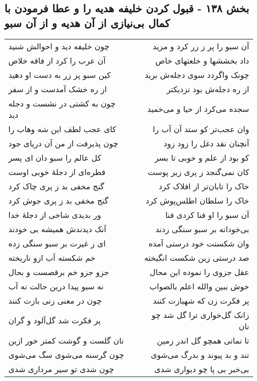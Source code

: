 \begin{center}
\section*{بخش ۱۳۸ - قبول کردن خلیفه هدیه را و عطا فرمودن با کمال بی‌نیازی از آن هدیه و از آن سبو}
\label{sec:sh138}
\begin{longtable}{l p{0.5cm} r}
چون خلیفه دید و احوالش شنید
&&
آن سبو را پر ز زر کرد و مزید
\\
آن عرب را کرد از فاقه خلاص
&&
داد بخششها و خلعتهای خاص
\\
کین سبو پر زر به دست او دهید
&&
چونک واگردد سوی دجله‌ش برید
\\
از ره خشک آمدست و از سفر
&&
از ره دجله‌ش بود نزدیکتر
\\
چون به کشتی در نشست و دجله دید
&&
سجده می‌کرد از حیا و می‌خمید
\\
کای عجب لطف این شه وهاب را
&&
وان عجب‌تر کو ستد آن آب را
\\
چون پذیرفت از من آن دریای جود
&&
آنچنان نقد دغل را زود زود
\\
کل عالم را سبو دان ای پسر
&&
کو بود از علم و خوبی تا بسر
\\
قطره‌ای از دجلهٔ خوبی اوست
&&
کان نمی‌گنجد ز پری زیر پوست
\\
گنج مخفی بد ز پری چاک کرد
&&
خاک را تابان‌تر از افلاک کرد
\\
گنج مخفی بد ز پری جوش کرد
&&
خاک را سلطان اطلس‌پوش کرد
\\
ور بدیدی شاخی از دجلهٔ خدا
&&
آن سبو را او فنا کردی فنا
\\
آنک دیدندش همیشه بی خودند
&&
بی‌خودانه بر سبو سنگی زدند
\\
ای ز غیرت بر سبو سنگی زده
&&
وان شکستت خود درستی آمده
\\
خم شکسته آب ازو ناریخته
&&
صد درستی زین شکست انگیخته
\\
جزو جزو خم برقصست و بحال
&&
عقل جزوی را نموده این محال
\\
نه سبو پیدا درین حالت نه آب
&&
خوش ببین والله اعلم بالصواب
\\
چون در معنی زنی بازت کنند
&&
پر فکرت زن که شهبازت کنند
\\
پر فکرت شد گل‌آلود و گران
&&
زانک گل‌خواری ترا گل شد چو نان
\\
نان گلست و گوشت کمتر خور ازین
&&
تا نمانی همچو گل اندر زمین
\\
چون گرسنه می‌شوی سگ می‌شوی
&&
تند و بد پیوند و بدرگ می‌شوی
\\
چون شدی تو سیر مرداری شدی
&&
بی‌خبر بی پا چو دیواری شدی

\end{longtable}
\end{center}
